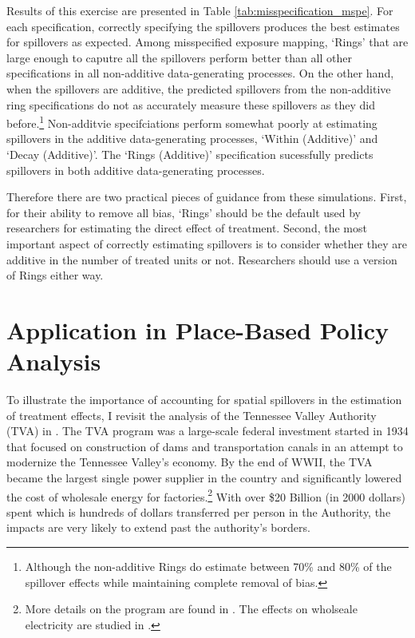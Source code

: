 \documentclass[11pt]{article}
\begin{document}
Results of this exercise are presented in Table \ref{tab:misspecification_mspe}. For each specification, correctly specifying the spillovers produces the best estimates for spillovers as expected. Among misspecified exposure mapping, `Rings' that are large enough to caputre all the spillovers perform better than all other specifications in all non-additive data-generating processes. On the other hand, when the spillovers are additive, the predicted spillovers from the non-additive ring specifications do not as accurately measure these spillovers as they did before.\footnote{Although the non-additive Rings do estimate between 70\% and 80\% of the spillover effects while maintaining complete removal of bias.} Non-additvie specifciations perform somewhat poorly at estimating spillovers in the additive data-generating processes, `Within (Additive)' and `Decay (Additive)'. The `Rings (Additive)' specification sucessfully predicts spillovers in both additive data-generating processes. 

Therefore there are two practical pieces of guidance from these simulations. First, for their ability to remove all bias, `Rings' should be the default used by researchers for estimating the direct effect of treatment. Second, the most important aspect of correctly estimating spillovers is to consider whether they are additive in the number of treated units or not. Researchers should use a version of Rings either way.



\section{Application in Place-Based Policy Analysis}
\label{sec:tva}

To illustrate the importance of accounting for spatial spillovers in the estimation of treatment effects, I revisit the analysis of the Tennessee Valley Authority (TVA) in \citet{Kline_Moretti_2014}. The TVA program was a large-scale federal investment started in 1934 that focused on construction of dams and transportation canals in an attempt to modernize the Tennessee Valley's economy. By the end of WWII, the TVA became the largest single power supplier in the country and significantly lowered the cost of wholesale energy for factories.\footnote{More details on the program are found in \citet{Kline_Moretti_2014}. The effects on wholseale electricity are studied in \citet{Kitchens_2014}.} With over \$20 Billion (in 2000 dollars) spent which is hundreds of dollars transferred per person in the Authority, the impacts are very likely to extend past the authority's borders. 
\end{document}
